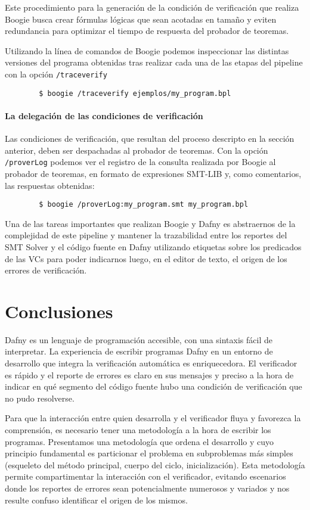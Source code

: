 \documentclass[12pt, a4paper, openany, fleqn]{book}
\begin{document}
    Este procedimiento para la generación de la condición de verificación que realiza Boogie busca crear fórmulas lógicas que sean acotadas en tamaño y eviten redundancia para optimizar el tiempo de respuesta del probador de teoremas.
  
    Utilizando la línea de comandos de Boogie podemos inspeccionar las distintas versiones del programa obtenidas tras realizar cada una de las etapas del pipeline con la opción \verb|/traceverify|
    \begin{verbatim}
        $ boogie /traceverify ejemplos/my_program.bpl
    \end{verbatim}

    \subsubsection*{La delegación de las condiciones de verificación}
    Las condiciones de verificación, que resultan del proceso descripto en la sección anterior, deben ser despachadas al probador de teoremas.
    Con la opción \verb|/proverLog| podemos ver el registro de la consulta realizada por Boogie al probador de teoremas, en formato de expresiones SMT-LIB y, como comentarios, las respuestas obtenidas:

    \begin{verbatim}
        $ boogie /proverLog:my_program.smt my_program.bpl
    \end{verbatim}

    Una de las tareas importantes que realizan Boogie y Dafny es abstraernos de la complejidad de este pipeline y mantener la trazabilidad entre los reportes del SMT Solver y el código fuente en Dafny utilizando etiquetas sobre los predicados de las VCs para poder indicarnos luego, en el editor de texto, el origen de los errores de verificación.

    \chapter{Conclusiones}
    Dafny es un lenguaje de programación accesible, con una sintaxis fácil de interpretar. La experiencia de escribir programas Dafny en un entorno de desarrollo que integra la verificación automática es enriquecedora. El verificador es rápido y el reporte de errores es claro en sus mensajes y preciso a la hora de indicar en qué segmento del código fuente hubo una condición de verificación que no pudo resolverse.

    Para que la interacción entre quien desarrolla y el verificador fluya y favorezca la comprensión, es necesario tener una metodología a la hora de escribir los programas. Presentamos una metodología que ordena el desarrollo y cuyo principio fundamental es particionar el problema en subproblemas más simples (esqueleto del método principal, cuerpo del ciclo, inicialización). Esta metodología permite compartimentar la interacción con el verificador, evitando escenarios donde los reportes de errores sean potencialmente numerosos y variados y nos resulte confuso identificar el origen de los mismos.
\end{document}
